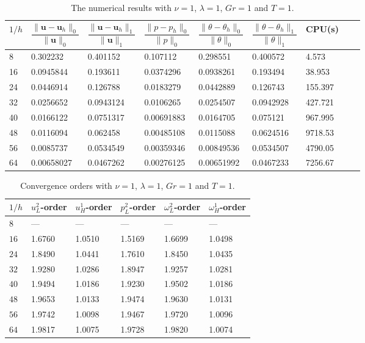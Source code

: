 \documentclass[10pt]{article}
\begin{document}
\begin{table}[htbp]
	\centering 
	\caption{The numerical results with $\nu=1$, $\lambda=1$, $Gr=1$ and $T=1$.}\label{T1}
	\begin{tabular}{lllllllll}
		\toprule
		$1/h$ & $\dfrac{\| \boldsymbol{u} - \boldsymbol{u}_h \|_0}{\| \boldsymbol{u} \|_0}$ & $\dfrac{\| \boldsymbol{u} - \boldsymbol{u}_h \|_1}{\| \boldsymbol{u} \|_1}$ & $\dfrac{\| p - p_h \|_0}{\| p \|_0}$ & $\dfrac{\| \theta - \theta_h \|_0}{\| \theta \|_0}$ & $\dfrac{\| \theta - \theta_h \|_1}{\| \theta \|_1}$  & CPU(s) \\
		\midrule
	8  & 0.302232 & 0.401152 & 0.107112 & 0.298551 & 0.400572 & 4.573\\
16  & 0.0945844 & 0.193611 & 0.0374296 & 0.0938261 & 0.193494 & 38.953 \\
	24  & 0.0446914 & 0.126788 & 0.0183279 & 0.0442889 & 0.126743 & 155.397\\
32 & 0.0256652 & 0.0943124 & 0.0106265 & 0.0254507 & 0.0942928 & 427.721\\
40  & 0.0166122 & 0.0751317 & 0.00691883 & 0.0164705 & 0.075121 & 
 967.995\\
	48  & 0.0116094 & 0.062458 & 0.00485108 & 0.0115088 & 0.0624516 & 9718.53 \\
	56  & 0.0085737 & 0.0534549 & 0.00359346 & 0.00849536 & 0.0534507 &  4790.05 \\
64  & 0.00658027 & 0.0467262 & 0.00276125 & 0.00651992 & 0.0467233 & 7256.67 \\
		\bottomrule
	\end{tabular}
	\label{tab:nu1}
\end{table}

\begin{table}[htbp]
	\centering
	\caption{Convergence orders with $\nu=1$, $\lambda=1$, $Gr=1$ and $T=1$.}
	\label{T2}
	\begin{tabular*}{0.66\textwidth}{llllll
		}
		\toprule
		$1/h$ & $u_L^2$-order & $u_H^1$-order & $p_L^2$-order &  $\omega_L^2$-order & $\omega_H^1$-order \\
		\midrule
		8   &--- & ---   &---   & ---  & ---  \\
	 $16$& 1.6760 & 1.0510 & 1.5169 & 1.6699 & 1.0498 \\
	  $24$& 1.8490 & 1.0441 & 1.7610 & 1.8450 & 1.0435 \\
	  $32$& 1.9280 & 1.0286 & 1.8947 & 1.9257 & 1.0281 \\
	  $40$& 1.9494 & 1.0186 & 1.9230 & 1.9502 & 1.0186 \\
	  $48$& 1.9653 & 1.0133 & 1.9474 & 1.9630 & 1.0131 \\
	  $56$& 1.9742 & 1.0098 & 1.9467 & 1.9720 & 1.0096 \\
	  $64$& 1.9817 & 1.0075 & 1.9728 & 1.9820 & 1.0074 \\
		\bottomrule
	\end{tabular*}
\end{table}
\end{document}
